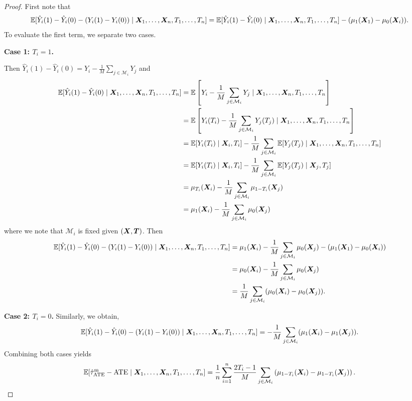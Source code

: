 \documentclass[11pt]{exam}
\begin{document}
\begin{proof}
    First note that 
    \[
     \mathbb{E}[ \hat Y_i(1) - \hat Y_i(0) - (Y_i(1) - Y_i(0)) \mid \bm{X}_1, \ldots, \bm{X}_n, T_1, \ldots, T_n] =  \mathbb{E}[ \hat Y_i(1) - \hat Y_i(0)\mid \bm{X}_1, \ldots, \bm{X}_n, T_1, \ldots, T_n] - (\mu_1(\bm{X}_1) - \mu_0(\bm{X}_i)).
    \]
    To evaluate the first term, we separate two cases.  
    
    \textbf{Case 1: $T_i = 1$.} 
    
    Then $\hat Y_i(1) - \hat Y_i(0) = Y_i - \frac{1}{M}\sum_{j \in \mathcal{M}_i} Y_j$ and 
    \begin{align*}
        \mathbb{E}[ \hat Y_i(1) - \hat Y_i(0)\mid \bm{X}_1, \ldots, \bm{X}_n, T_1, \ldots, T_n] &= \mathbb{E}\left[Y_i - \frac{1}{M}\sum_{j \in \mathcal{M}_i} Y_j \mid \bm{X}_1, \ldots, \bm{X}_n, T_1, \ldots, T_n\right]
        \\
        &= \mathbb{E}\left[Y_i(T_i) - \frac{1}{M}\sum_{j \in \mathcal{M}_i} Y_j(T_j) \mid \bm{X}_1, \ldots, \bm{X}_n, T_1, \ldots, T_n\right]
        \\
        &= \mathbb{E}[Y_i(T_i) \mid \bm{X}_i, T_i] -  \frac{1}{M}\sum_{j \in \mathcal{M}_i} \mathbb{E}[Y_j(T_j) \mid \bm{X}_1, \ldots, \bm{X}_n, T_1, \ldots, T_n] 
        \\
        &= \mathbb{E}[Y_i(T_i) \mid \bm{X}_i, T_i] -  \frac{1}{M}\sum_{j \in \mathcal{M}_i} \mathbb{E}[Y_j(T_j) \mid \bm{X}_j, T_j] 
        \\
        &= \mu_{T_i}(\bm{X}_i) -  \frac{1}{M}\sum_{j \in \mathcal{M}_i} \mu_{1 - T_i}(\bm{X}_j)
        \\
        &= \mu_{1}(\bm{X}_i) -  \frac{1}{M}\sum_{j \in \mathcal{M}_i} \mu_{0}(\bm{X}_j)
    \end{align*}
    where we note that $\mathcal{M}_i$ is fixed given $(\bm{X}, \bm{T})$. Then
    \begin{align*}
        \mathbb{E}[ \hat Y_i(1) - \hat Y_i(0) - (Y_i(1) - Y_i(0)) \mid\bm{X}_1, \ldots, \bm{X}_n, T_1, \ldots, T_n] &= \mu_{1}(\bm{X}_i) -  \frac{1}{M}\sum_{j \in \mathcal{M}_i} \mu_{0}(\bm{X}_j) -  (\mu_1(\bm{X}_1) - \mu_0(\bm{X}_i))
        \\
        &= \mu_0(\bm{X}_i) -  \frac{1}{M}\sum_{j \in \mathcal{M}_i} \mu_{0}(\bm{X}_j)
        \\
        &= \frac{1}{M} \sum_{j \in \mathcal{M}_i} (\mu_0(\bm{X}_i) - \mu_0(\bm{X}_j)).
    \end{align*}

    \textbf{Case 2: $T_i = 0$.} Similarly, we obtain,
    \[
        \mathbb{E}[ \hat Y_i(1) - \hat Y_i(0) - (Y_i(1) - Y_i(0)) \mid \bm{X}_1, \ldots, \bm{X}_n, T_1, \ldots, T_n] = - \frac{1}{M} \sum_{j \in \mathcal{M}_i} (\mu_1(\bm{X}_i) - \mu_1(\bm{X}_j)).
    \]
    Combining both cases yields
    \[
    \mathbb{E}[\hat \tau^\mathrm{m}_{\mathrm{ATE}} - \mathrm{ATE} \mid \bm{X}_1, \ldots, \bm{X}_n, T_1, \ldots, T_n] = \frac{1}{n} \sum_{i=1}^n \frac{2T_i - 1}{M} \sum_{j \in \mathcal{M}_i} \left(\mu_{1- T_i}(\bm{X}_i) - \mu_{1- T_i}(\bm{X}_j)\right).
    \]
\end{proof}
\end{document}

